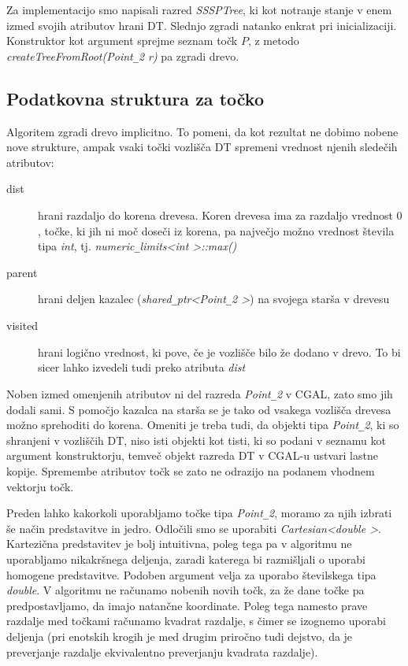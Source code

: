 \documentclass[a4paper, 12pt]{book}
\newcommand{\U}{\texttt{\_}}
\begin{document}
Za implementacijo smo napisali razred \textit{SSSPTree}, ki kot notranje stanje v enem izmed svojih atributov hrani DT. Slednjo zgradi natanko enkrat pri inicializaciji. Konstruktor kot argument sprejme seznam točk $P$, z metodo \textit{createTreeFromRoot(Point\U 2 r)} pa zgradi drevo.

\subsection{Podatkovna struktura za točko}
\label{point-refs}
Algoritem zgradi drevo implicitno. To pomeni, da kot rezultat ne dobimo nobene nove strukture, ampak vsaki točki vozlišča DT spremeni vrednost njenih sledečih atributov:

\begin{description}
\item[dist] hrani razdaljo do korena drevesa. Koren drevesa ima za razdaljo vrednost $0$, točke, ki jih ni moč doseči iz korena, pa največjo možno vrednost števila tipa \textit{int}, tj. \textit{numeric\U limits\textless int \textgreater ::max()}
\item[parent] hrani deljen kazalec (\textit{shared\U ptr\textless Point\U 2 \textgreater}) na svojega starša v drevesu
\item[visited] hrani logično vrednost, ki pove, če je vozlišče bilo že dodano v drevo. To bi sicer lahko izvedeli tudi preko atributa \textit{dist}
\end{description}

Noben izmed omenjenih atributov ni del razreda \textit{Point\U 2} v CGAL, zato smo jih dodali sami. S pomočjo kazalca na starša se je tako od vsakega vozlišča drevesa možno sprehoditi do korena. Omeniti je treba tudi, da objekti tipa \textit{Point\U 2}, ki so shranjeni v vozliščih DT, niso isti objekti kot tisti, ki so podani v seznamu kot argument konstruktorju, temveč objekt razreda DT v CGAL-u ustvari lastne kopije. Spremembe atributov točk se zato ne odrazijo na podanem vhodnem vektorju točk. 

Preden lahko kakorkoli uporabljamo točke tipa \textit{Point\U 2}, moramo za njih izbrati še način predstavitve in jedro. Odločili smo se uporabiti \textit{Cartesian\textless double \textgreater}. Kartezična predstavitev je bolj intuitivna, poleg tega pa v algoritmu ne uporabljamo nikakršnega deljenja, zaradi katerega bi razmišljali o uporabi homogene predstavitve. Podoben argument velja za uporabo številskega tipa \textit{double}. V algoritmu ne računamo nobenih novih točk, za že dane točke pa predpostavljamo, da imajo natančne koordinate. Poleg tega namesto prave razdalje med točkami računamo kvadrat razdalje, s čimer se izognemo uporabi deljenja (pri enotskih krogih je med drugim priročno tudi dejstvo, da je preverjanje razdalje ekvivalentno preverjanju kvadrata razdalje).
\end{document}

